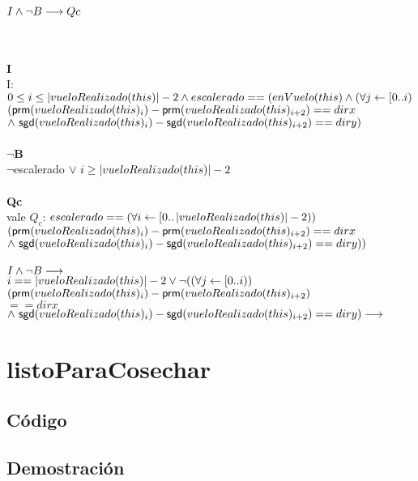 \documentclass[a4paper]{article}
\begin{document}
        \begin{Large}
        {$I \land \neg B \longrightarrow Qc$}
        \end{Large}\\
        \\
        \textbf{I}\\
		I: $ 0 \leq i \leq \left| vueloRealizado(this) \right| -2 \land escalerado == (enVuelo(this) \land (\forall j \leftarrow [0..i) $ $ (\mathsf{prm}(vueloRealizado(this)_i) - \mathsf{prm}(vueloRealizado(this)_{i+2}) == dirx $ $ \land \ \mathsf{sgd}(vueloRealizado(this)_i) - \mathsf{sgd}(vueloRealizado(this)_{i+2}) == diry) $\\
        \\
        \textbf{$\neg$B}\\
        $\neg$escalerado$ \ \vee \ i \geq \left| vueloRealizado(this) \right| - 2$\\
        \\ 
        \textbf{Qc}\\ 
        vale $Q_c$: $ escalerado == (\forall i \leftarrow [0..\left| vueloRealizado(this) \right| - 2)) $ $ (\mathsf{prm}(vueloRealizado(this)_i) - \mathsf{prm}(vueloRealizado(this)_{i+2}) == dirx $ $ \land \ \mathsf{sgd}(vueloRealizado(this)_i) - \mathsf{sgd}(vueloRealizado(this)_{i+2}) == diry)) $ \\ 
        \\ $I \land \neg B \longrightarrow $\\ 
        $i == \left| vueloRealizado(this) \right| -2 \vee \neg ((\forall j \leftarrow [0..i)) $\\ $ (\mathsf{prm}(vueloRealizado(this)_i) - \mathsf{prm}(vueloRealizado(this)_{i+2})$\\$ == dirx $ $ \land \ \mathsf{sgd}(vueloRealizado(this)_i) - \mathsf{sgd}(vueloRealizado(this)_{i+2}) == diry) \longrightarrow $\\ 
        $  $ 

\newpage

\section{listoParaCosechar}

    \subsection{C\'odigo}
    

    \subsection{Demostraci\'on}
        \noindent
       
\end{document}
